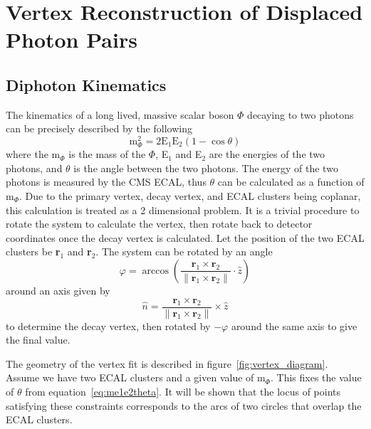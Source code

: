 \section{Vertex Reconstruction of Displaced Photon Pairs} \label{sec:ana_vertex}
\subsection{Diphoton Kinematics} \label{sec:vertex_calc}
The kinematics of a long lived, massive scalar boson $\Phi$ decaying to two photons can be precisely described by the following
\begin{equation}\label{eq:me1e2theta}
	\text{m}_{\Phi}^2 = 2\text{E}_1\text{E}_2(1-\cos\theta)
\end{equation}
where the m$_\Phi$ is the mass of the $\Phi$, E$_1$ and E$_2$ are the energies of the two photons, and $\theta$ is the angle between the two photons. The energy of the two photons is measured by the CMS ECAL, thus $\theta$ can be calculated as a function of m$_\Phi$. Due to the primary vertex, decay vertex, and ECAL clusters being coplanar, this calculation is treated as a 2 dimensional problem. It is a trivial procedure to rotate the system to calculate the vertex, then rotate back to detector coordinates once the decay vertex is calculated. Let the position of the two ECAL clusters be \textbf{r$_1$} and \textbf{r$_2$}. The system can be rotated by an angle
\begin{equation} \label{eq:rot_angle}
	\varphi=\arccos\left(\frac{\textbf{r}_1\times\textbf{r}_2}{\|\textbf{r}_1\times\textbf{r}_2\|}\cdot\hat{z}\right)
\end{equation}
around an axis given by 
\begin{equation} \label{eq:rot_axis}
	\hat{n}=\frac{\textbf{r}_1\times\textbf{r}_2}{\|\textbf{r}_1\times\textbf{r}_2\|}\times\hat{z}
\end{equation}
to determine the decay vertex, then rotated by $-\varphi$ around the same axis to give the final value.

The geometry of the vertex fit is described in figure~\ref{fig:vertex_diagram}. Assume we have two ECAL clusters and a given value of m$_\Phi$. This fixes the value of $\theta$ from equation~\ref{eq:me1e2theta}. It will be shown that the locus of points satisfying these constraints corresponds to the arcs of two circles that overlap the ECAL clusters.

